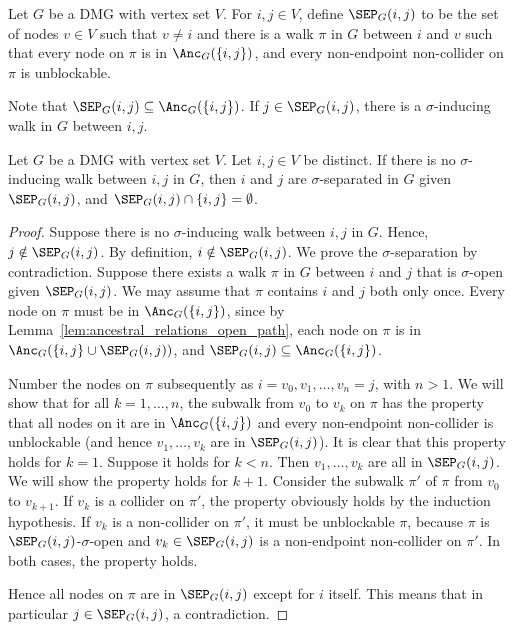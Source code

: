 \begin{Def}\label{def:DSEP}
  Let $G$ be a DMG with vertex set $V$. 
  For $i,j \in V$, define $\SEP_G(i,j)$ to be the set of nodes $v \in V$ such that
  $v \ne i$ and there is a walk $\pi$ in $G$ between $i$ and $v$ such that every node
  on $\pi$ is in $\Anc_G(\{i,j\})$, and 
  every non-endpoint non-collider on $\pi$ is unblockable.
\end{Def}
Note that $\SEP_G(i,j) \subseteq \Anc_G(\{i,j\})$.
If $j \in \SEP_G(i,j)$, there is a $\sigma$-inducing walk in $G$ between $i,j$.
\begin{Prp}\label{prp:DSEP}
  Let $G$ be a DMG with vertex set $V$.
  Let $i,j \in V$ be distinct.
  If there is no $\sigma$-inducing walk between $i,j$ in $G$, then $i$ and $j$ are $\sigma$-separated in $G$ given $\SEP_G(i,j)$,
  and $\SEP_G(i,j) \cap \{i,j\} = \emptyset$.
\end{Prp}
\begin{proof}
  Suppose there is no $\sigma$-inducing walk between $i,j$ in $G$.
  Hence, $j \notin \SEP_G(i,j)$.
  By definition, $i \notin \SEP_G(i,j)$.
  We prove the $\sigma$-separation by contradiction.
  Suppose there exists a walk $\pi$ in $G$ between $i$ and $j$ that is $\sigma$-open given $\SEP_G(i,j)$.
  We may assume that $\pi$ contains $i$ and $j$ both only once.
  Every node on $\pi$ must be in $\Anc_G(\{i,j\})$, since
  by Lemma~\ref{lem:ancestral_relations_open_path}, each node on $\pi$ is in $\Anc_G(\{i,j\} \cup \SEP_G(i,j))$,
  and $\SEP_G(i,j) \subseteq \Anc_G(\{i,j\})$.

  Number the nodes on $\pi$ subsequently as $i = v_0, v_1, \dots, v_n = j$, with $n > 1$.
  We will show that for all $k = 1,\dots,n$, the subwalk from $v_0$ to $v_k$ on $\pi$ has the property that all nodes on it are in $\Anc_G(\{i,j\})$ and every non-endpoint non-collider is unblockable (and hence $v_1,\dots,v_k$ are in $\SEP_G(i,j)$).
  It is clear that this property holds for $k=1$. 
  Suppose it holds for $k < n$.
  Then $v_1,\dots,v_k$ are all in $\SEP_G(i,j)$.
  We will show the property holds for $k+1$.
  Consider the subwalk $\pi'$ of $\pi$ from $v_0$ to $v_{k+1}$.
  If $v_{k}$ is a collider on $\pi'$, the property obviously holds by the induction hypothesis.
  If $v_{k}$ is a non-collider on $\pi'$, it must be unblockable $\pi$, because $\pi$ is $\SEP_G(i,j)$-$\sigma$-open and $v_k \in \SEP_G(i,j)$ is a non-endpoint non-collider on $\pi'$.
  In both cases, the property holds.

  Hence all nodes on $\pi$ are in $\SEP_G(i,j)$ except for $i$ itself.
  This means that in particular $j \in \SEP_G(i,j)$, a contradiction.
\end{proof}

